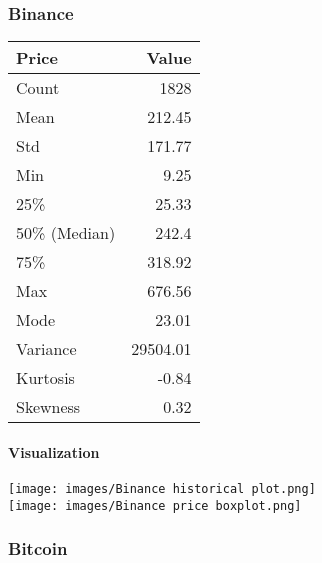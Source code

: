 \documentclass{ieeeojies}
\begin{document}
\subsubsection{Binance}
\vspace{0.5cm}
\begin{center}
\begin{tabular}{|l|r|}
\hline
\textbf{Price} & \textbf{Value} \\
\hline
Count & 1828 \\
\hline
Mean & 212.45 \\
\hline
Std & 171.77 \\
\hline
Min & 9.25 \\
\hline
25\% & 25.33 \\
\hline
50\% (Median) & 242.4 \\
\hline
75\% & 318.92 \\
\hline
Max & 676.56 \\
\hline
Mode & 23.01 \\
\hline
Variance & 29504.01 \\
\hline
Kurtosis & -0.84 \\
\hline
Skewness & 0.32 \\
\hline
\end{tabular}
\end{center}
\paragraph{Visualization}
\texttt{[image: images/Binance historical plot.png]}\\
\texttt{[image: images/Binance price boxplot.png]}
\subsubsection{Bitcoin}
\end{document}
